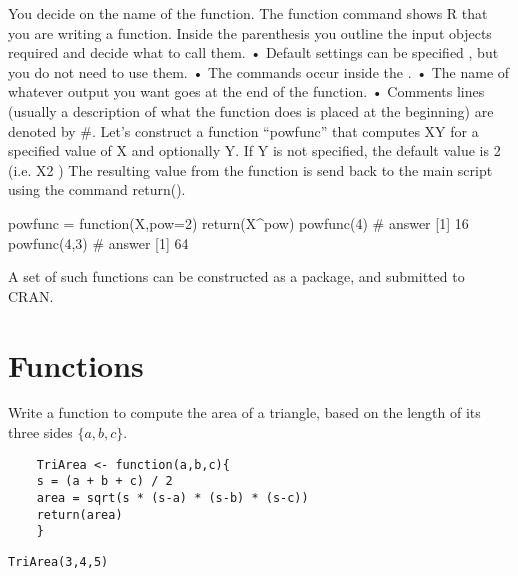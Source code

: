You decide on the name of the function. The function command shows R that you are writing a function. Inside the parenthesis you outline the input objects required and decide what to call them.
•	Default settings can be specified , but you do not need to use them.
•	The commands occur inside the { }.
•	The name of whatever output you want goes at the end of the function. 
•	Comments lines (usually a description of what the function does is placed at the beginning) are denoted by #.
Let’s construct a function “powfunc” that computes XY for a specified value of X and optionally Y. If Y is not specified, the default value is 2 (i.e. X2 )
The resulting value from the function is send back to the main script using the command return().

powfunc = function(X,pow=2){
return(X^pow)
}
powfunc(4)
# answer [1] 16
powfunc(4,3)
# answer [1] 64

A set of such functions can be constructed as a package, and submitted to CRAN.



\section{Functions}

Write a function to compute the area of a triangle, based on the length of its three sides $\{a,b,c\}$.

\begin{framed}
	\begin{verbatim}
	TriArea <- function(a,b,c){
	s = (a + b + c) / 2 
	area = sqrt(s * (s-a) * (s-b) * (s-c))
	return(area)
	}
	\end{verbatim}
\end{framed}

\begin{verbatim}
TriArea(3,4,5)
\end{verbatim}



